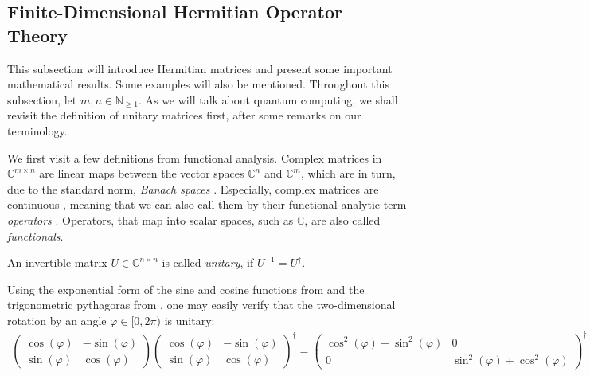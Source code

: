 \subsection{Finite-Dimensional Hermitian Operator Theory }

This subsection will introduce Hermitian matrices and present some important mathematical results. Some examples will also be mentioned. Throughout this subsection, let \(m, n \in \mathbb{N}_{\geq 1}\). As we will talk about quantum computing, we shall revisit the definition of unitary matrices first, after some remarks on our terminology.

\begin{remark} \label{remark_functional_analytic_terminology}
    We first visit a few definitions from functional analysis. Complex matrices in \(\mathbb{C}^{m \times n}\) are linear maps between the vector spaces \(\mathbb{C}^n\) and \(\mathbb{C}^m\), which are in turn, due to the standard norm, \emph{Banach spaces} \cite[p. 2]{Werner2018}. Especially, complex matrices are continuous \cite[p. 35]{Forster2017}, meaning that we can also call them by their functional-analytic term \emph{operators} \cite[p. 49]{Werner2018}. Operators, that map into scalar spaces, such as \(\mathbb{C}\), are also called \emph{functionals}.
\end{remark}

\begin{definition} \label{definition_unitary_matrix}
    An invertible matrix \(U \in \mathbb{C}^{n \times n}\) is called \emph{unitary}, if \(U^{-1} = U^\dagger\).
\end{definition}

\begin{example} \label{example_unitary_rotation}
    Using the exponential form of the sine and cosine functions from  and the trigonometric pythagoras from , one may easily verify that the two-dimensional rotation by an angle \(\varphi \in [0, 2\pi)\) is unitary:
    \begin{align}
        \begin{pmatrix}
            \cos(\varphi) & -\sin(\varphi)\\
            \sin(\varphi) & \cos(\varphi)
        \end{pmatrix} \begin{pmatrix}
            \cos(\varphi) & -\sin(\varphi)\\
            \sin(\varphi) & \cos(\varphi)
        \end{pmatrix}^\dagger = \begin{pmatrix}
            \cos^2(\varphi)+\sin^2(\varphi) & 0\\
            0 & \sin^2(\varphi)+\cos^2(\varphi)
        \end{pmatrix}^\dagger = E_2
    \end{align}
\end{example}

